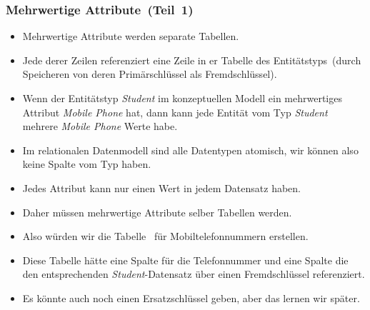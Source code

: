 \documentclass[aspectratio=169,mathserif,notheorems]{beamer}%
\begin{document}
%
\begin{frame}%
\frametitle{Mehrwertige Attribute~(Teil~1)}%
\begin{itemize}%
\item Mehrwertige Attribute werden separate Tabellen.%
\item<2-> Jede derer Zeilen referenziert eine Zeile in er Tabelle des Entitätstyps~(durch Speicheren von deren Primärschlüssel als Fremdschlüssel).%
\item<3-> Wenn der Entitätstyp \emph{Student} im konzeptuellen Modell ein mehrwertiges Attribut \emph{Mobile Phone} hat, dann kann jede Entität vom Typ \emph{Student} mehrere \emph{Mobile Phone} Werte habe.%
%
\item<4-> Im relationalen Datenmodell sind alle Datentypen atomisch, wir können also keine Spalte vom Typ   haben.%
%
\item<5-> Jedes Attribut kann nur einen Wert in jedem Datensatz haben.%
%
\item<6-> Daher müssen mehrwertige Attribute selber Tabellen werden.%
%
\item<7-> Also würden wir die Tabelle~ für Mobiltelefonnummern erstellen.%
%
\item<8-> Diese Tabelle hätte eine Spalte für die Telefonnummer und eine Spalte die den entsprechenden \emph{Student}-Datensatz über einen Fremdschlüssel referenziert.%
%
\item<9-> Es könnte auch noch einen Ersatzschlüssel geben, aber das lernen wir später.%
%
\end{itemize}%
\end{frame}%
%
%
\end{document}
